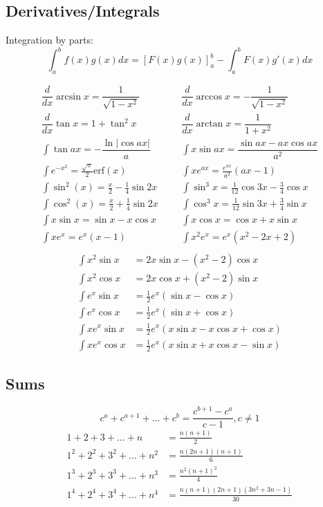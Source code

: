 \subsection{Derivatives/Integrals}

Integration by parts:
\[\int_a^bf(x)g(x)dx = [F(x)g(x)]_a^b-\int_a^bF(x)g'(x)dx\]

\begin{align*}
	\dfrac{d}{dx}\arcsin x = \dfrac{1}{\sqrt{1-x^2}} &&& \dfrac{d}{dx}\arccos x = -\dfrac{1}{\sqrt{1-x^2}} \\
	\dfrac{d}{dx}\tan x = 1+\tan^2 x &&& \dfrac{d}{dx}\arctan x = \dfrac{1}{1+x^2} \\
	\int\tan ax = -\dfrac{\ln|\cos ax|}{a} &&& \int x\sin ax = \dfrac{\sin ax-ax \cos ax}{a^2} \\
	\int e^{-x^2} = \frac{\sqrt \pi}{2} \text{erf}(x) &&& \int xe^{ax} = \frac{e^{ax}}{a^2}(ax-1) \\
    \int \sin^2(x) = \frac{x}{2} - \frac{1}{4} \sin 2x &&& \int \sin^3 x = \frac{1}{12}\cos 3x - \frac{3}{4} \cos x \\
    \int \cos^2(x) = \frac{x}{2} + \frac{1}{4} \sin 2x &&& \int \cos^3 x = \frac{1}{12}\sin 3x + \frac{3}{4} \sin x \\
    \int x \sin x = \sin x - x \cos x &&& \int x \cos x = \cos x + x \sin x \\
    \int xe^x = e^x(x - 1) &&& \int x^2 e^x = e^x(x^2 - 2x + 2) \\
\end{align*}
\begin{align*}
    \int x^2 \sin x &= 2x \sin x - (x^2 - 2) \cos x \\
    \int x^2 \cos x &= 2x \cos x + (x^2 - 2) \sin x \\
    \int e^x \sin x &= \frac{1}{2}e^x (\sin x - \cos x) \\
    \int e^x \cos x &= \frac{1}{2}e^x (\sin x + \cos x) \\
    \int xe^x \sin x &= \frac{1}{2}e^x (x \sin x - x \cos x + \cos x) \\
    \int xe^x \cos x &= \frac{1}{2}e^x (x \sin x + x \cos x - \sin x)
\end{align*}

\subsection{Sums}
\[ c^a + c^{a+1} + \dots + c^{b} = \frac{c^{b+1} - c^a}{c-1}, c \neq 1 \]
\begin{align*}
	1 + 2 + 3 + \dots + n &= \frac{n(n+1)}{2} \\
	1^2 + 2^2 + 3^2 + \dots + n^2 &= \frac{n(2n+1)(n+1)}{6} \\
	1^3 + 2^3 + 3^3 + \dots + n^3 &= \frac{n^2(n+1)^2}{4} \\
	1^4 + 2^4 + 3^4 + \dots + n^4 &= \frac{n(n+1)(2n+1)(3n^2 + 3n - 1)}{30} \\
\end{align*}

